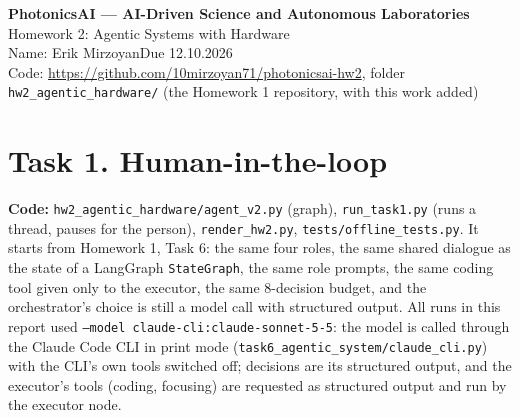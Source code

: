 \documentclass[11pt,a4paper]{article}
\newcommand{\studentname}{Erik Mirzoyan}  %
\newcommand{\repourl}{https://github.com/10mirzoyan71/photonicsai-hw2}
\begin{document}
\begin{center}
{\Large\bfseries PhotonicsAI --- AI-Driven Science and Autonomous Laboratories}\\[3pt]
{\large Homework 2: Agentic Systems with Hardware}\\[6pt]
Name: \studentname \qquad Due 12.10.2026\\[2pt]
Code: \url{\repourl}, folder \texttt{hw2\_agentic\_hardware/} (the Homework 1 repository, with this work added)
\end{center}

\section*{Task 1. Human-in-the-loop}
\textbf{Code:} \texttt{hw2\_agentic\_hardware/agent\_v2.py} (graph), \texttt{run\_task1.py} (runs a thread, pauses for the
person), \texttt{render\_hw2.py}, \texttt{tests/offline\_tests.py}. It starts from Homework 1, Task 6: the same four roles,
the same shared dialogue as the state of a LangGraph \texttt{StateGraph}, the same role prompts, the same coding tool given
only to the executor, the same 8-decision budget, and the orchestrator's choice is still a model call with structured output.
All runs in this report used \texttt{--model claude-cli:claude-sonnet-5-5}: the model is called through the Claude Code CLI
in print mode (\texttt{task6\_agentic\_system/claude\_cli.py}) with the CLI's own tools switched off; decisions are its
structured output, and the executor's tools (coding, focusing) are requested as structured output and run by the executor node.
\end{document}
